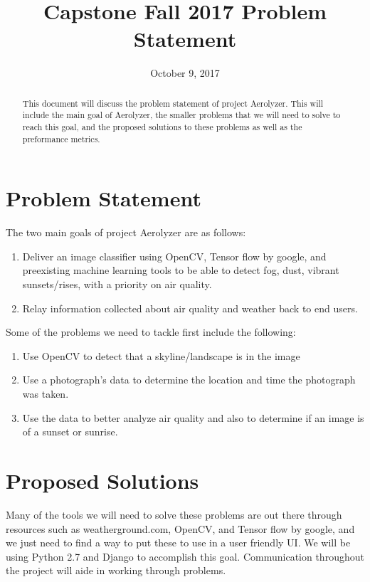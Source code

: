 \documentclass[letterpaper,10pt, draftclsnofoot,onecolumn]{IEEEtran}
\title{Capstone Fall 2017 Problem Statement}
\date{October 9, 2017}
\author{\authors}
\begin{document}
\begin{titlepage}
\maketitle
\centering
\begin{abstract}
This document will discuss the problem statement of project Aerolyzer.
This will include the main goal of Aerolyzer, the smaller problems that we will need to solve to reach this goal, 
and the proposed solutions to these problems as well as the preformance metrics.  
\end{abstract}
\end{titlepage}

\hrulefill

\section{Problem Statement}
The two main goals of project Aerolyzer are as follows:
\begin{enumerate}
\item Deliver an image classifier using OpenCV, Tensor flow by google, and preexisting machine learning tools to be able to detect fog, dust, vibrant sunsets/rises, with a priority on air quality.

\item Relay information collected about air quality and weather back to end users.
\end{enumerate}

Some of the problems we need to tackle first include the following:
\begin{enumerate}
\item Use OpenCV to detect that a skyline/landscape is in the image

\item Use a photograph's data to determine the location and time the photograph was taken.
\item Use the data to better analyze air quality and also to determine if an image is of a sunset or sunrise. 
\end{enumerate}

\hrulefill

\section{Proposed Solutions}
Many of the tools we will need to solve these problems are out there through resources such as weatherground.com, OpenCV, and Tensor flow by google, and we just need to find a way to put these to use in a user friendly UI. We will be using Python 2.7 and Django to accomplish this goal. Communication throughout the project will aide in working through problems.
\end{document}
